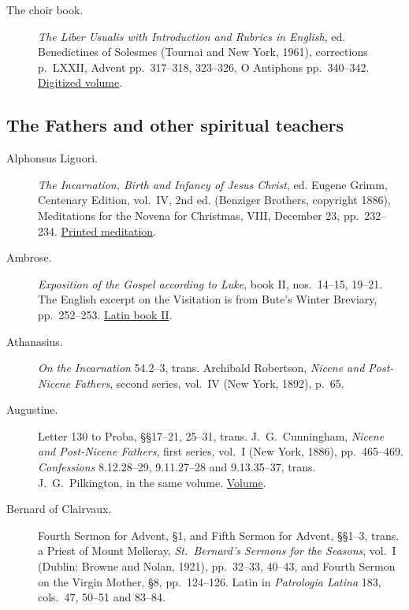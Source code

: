 \begin{description}
\item[The choir book.] \textit{The Liber Usualis with Introduction and
  Rubrics in English}, ed. Benedictines of Solesmes (Tournai and New
  York, 1961), corrections p.~LXXII, Advent pp.~317--318, 323--326,
  O Antiphons pp.~340--342.
  \href{https://propria.org/wp-content/uploads/2019/10/liber-usualis-1961.pdf}{Digitized volume}.
\end{description}

\subsection{The Fathers and other spiritual teachers}

\begin{description}
\item[Alphonsus Liguori.] \textit{The Incarnation, Birth and Infancy
  of Jesus Christ}, ed. Eugene Grimm, Centenary Edition, vol.~IV,
  2nd ed. (Benziger Brothers, copyright 1886), Meditations for the
  Novena for Christmas, VIII, December 23, pp.~232--234.
  \href{https://archive.org/details/incarnationofjes04liguuoft/page/232/mode/2up}{Printed meditation}.

\item[Ambrose.] \textit{Exposition of the Gospel according to Luke},
  book II, nos.~14--15, 19--21. The English excerpt on the Visitation
  is from Bute's Winter Breviary, pp.~252--253.
  \href{https://la.wikisource.org/wiki/Expositio_Evangelii_secundum_Lucam_(Ambrosius)/2}{Latin book II}.

\item[Athanasius.] \textit{On the Incarnation} 54.2--3,
  trans. Archibald Robertson, \textit{Nicene and Post-Nicene Fathers},
  second series, vol.~IV (New York, 1892), p.~65.

\item[Augustine.] Letter 130 to Proba,
  \S\S17--21, 25--31, trans. J.~G.~Cunningham, \textit{Nicene and Post-Nicene
  Fathers}, first series, vol.~I (New York, 1886), pp.~465--469.
  \textit{Confessions} 8.12.28--29, 9.11.27--28 and 9.13.35--37,
  trans. J.~G.~Pilkington, in the same volume.
  \href{https://www.ccel.org/ccel/schaff/npnf101.html}{Volume}.

\item[Bernard of Clairvaux.] Fourth Sermon for Advent, \S1, and
  Fifth Sermon for Advent, \S\S1--3,
  trans. a Priest of Mount Melleray, \textit{St.~Bernard's Sermons
  for the Seasons}, vol.~I (Dublin: Browne and Nolan, 1921),
  pp.~32--33, 40--43, and Fourth Sermon on the Virgin Mother, \S8,
  pp.~124--126. Latin in \textit{Patrologia Latina} 183, cols.~47,
  50--51 and 83--84.


\end{description}
